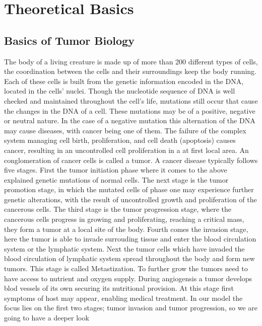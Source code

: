 \section{Theoretical Basics}
\subsection{Basics of Tumor Biology}
The body of a living creature is made up of more than 200 different 
types of cells, the coordination between the cells and their 
surroundings keep the body running. Each of these cells is built from 
the genetic information encoded in the DNA, located in the 
cells' nuclei. Though the nucleotide sequence of DNA is well 
checked and maintained throughout the cell's life, mutations still
occur that cause the changes in the DNA of a cell. These mutations may 
be of a positive, negative or neutral nature. In the case of a negative 
mutation this alternation of the DNA may cause diseases, with cancer being one 
of them. The failure of the complex system managing cell birth, proliferation, 
and cell death (apoptosis) causes cancer, resulting in an uncontrolled cell proliferation in a at 
first local area. An conglomeration of cancer cells is called a tumor. \newline
A cancer disease typically follows five stages. First the tumor initiation phase where it comes to the above 
explained genetic mutations of normal cells. The next stage is the tumor promotion stage, in which 
the mutated cells of phase one may experience further genetic alterations, with the result of 
uncontrolled growth and proliferation of the cancerous cells. The third stage is the tumor 
progression stage, where the cancerous cells progress in growing and proliferating, reaching a critical mass, they form a tumor at a 
local site of the body. Fourth comes the invasion stage, here the tumor is able to invade surrouding tissue 
and enter the blood circulation system or the lymphatic system. Next the tumor cells which have invaded 
the blood circulation of lymphatic system spread throughout the body and form new tumors. This stage is called Metastization.
To further grow the tumors need to have access to nutrient and oxygen supply. During angiogensis a tumor develops 
blod vessels of its own securing its nutritional provision. At this stage first symptoms of host may appear, enabling medical 
treatment.\newline
In our model the focus lies on the first two stages; tumor invasion and tumor progression, so we are going to have a deeper look 

